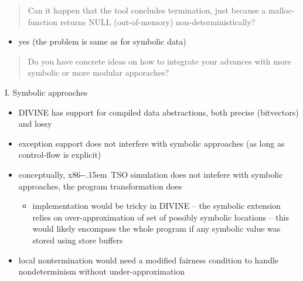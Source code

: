 \documentclass[aspectratio=169, fi]{paradise-slide}
\newcommand{\xtso}{\mbox{x86-\kern-.15em TSO}\xspace}
\newcommand{\rquote}[1]{\begin{quote}#1\end{quote}\bigskip\setlength{\leftmargini}{1em}}
\begin{document}
\begin{frame}[noframenumbering]{\qtitle}
  \rquote{Can it happen that the tool concludes termination, just because a malloc-function returns
    NULL (out-of-memory) non-deterministically?}
  \begin{itemize}
    \item yes (the problem is same as for symbolic data)
  \end{itemize}
\end{frame}

\begin{frame}[noframenumbering]{\qtitle}
  \rquote{Do you have concrete ideas on how to integrate your advances with more symbolic or more
    modular apporaches?}

  \textrm{I.} Symbolic approaches
  \begin{itemize}
    \item DIVINE has support for compiled data abstractions, both precise (bitvectors) and lossy
      \pause
    \item exception support does not interfere with symbolic approaches (as long as control-flow is
      explicit)
      \pause
    \item conceptually, \xtso simulation does not intefere with symbolic approaches, the program
      transformation does
      \begin{itemize}
        \item implementation would be tricky in DIVINE
          – the symbolic extension relies on over-approximation of set of possibly symbolic
          locations – this would likely encompass the whole program if any symbolic value was stored
          using store buffers
      \end{itemize}
      \pause
    \item local nontermination would need a modified fairness condition to handle nondeterminism
      without under-approximation
  \end{itemize}
\end{frame}
\end{document}
